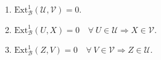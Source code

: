 \documentclass[preview]{standalone}
\begin{document}
\begin{center}
\begin{enumerate} \item $\text{Ext}^1_\mathscr{B} (\mathcal{U}, \mathcal{V}) = 0$. \item $\text{Ext}^1_\mathscr{B} (U, X) = 0 \quad \forall \ U\in\mathcal{U} \Rightarrow X\in\mathcal{V}$. \item $\text{Ext}^1_\mathscr{B} (Z, V) = 0 \quad \forall \ V\in\mathcal{V} \Rightarrow Z\in\mathcal{U}$. \end{enumerate}
\end{center}
\end{document}
